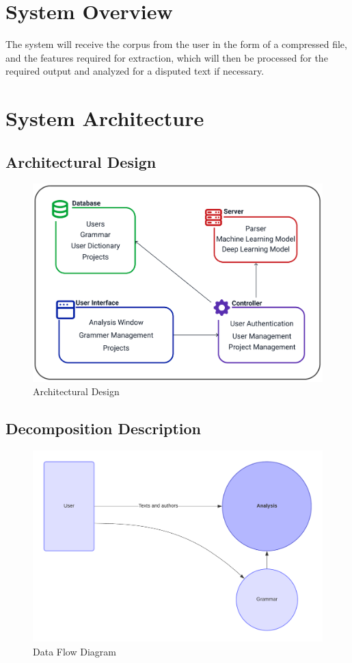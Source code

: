 \section{System Overview}
The system will receive the corpus from the user in the form of a compressed file, and the features required for extraction, which will then be processed for the required output and analyzed for a disputed text if necessary.

\section{System Architecture}
\subsection{Architectural Design}

\begin{figure}[tbh]
    \centering
    \includegraphics[width=0.7\linewidth]{images/System Overview.png}
    \caption{Architectural Design}
    \label{fig:image}
\end{figure}


\subsection{Decomposition Description}
\begin{figure}[H]
    \includegraphics[width=15cm]{images/DFD.png}
    \caption{Data Flow Diagram}
\end{figure}

